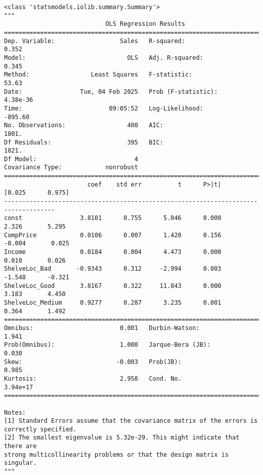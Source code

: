 \documentclass[
  letterpaper,
  DIV=11,
  numbers=noendperiod]{scrreprt}
\begin{document}
\begin{verbatim}
<class 'statsmodels.iolib.summary.Summary'>
"""
                            OLS Regression Results                            
==============================================================================
Dep. Variable:                  Sales   R-squared:                       0.352
Model:                            OLS   Adj. R-squared:                  0.345
Method:                 Least Squares   F-statistic:                     53.63
Date:                Tue, 04 Feb 2025   Prob (F-statistic):           4.38e-36
Time:                        09:05:52   Log-Likelihood:                -895.60
No. Observations:                 400   AIC:                             1801.
Df Residuals:                     395   BIC:                             1821.
Df Model:                           4                                         
Covariance Type:            nonrobust                                         
====================================================================================
                       coef    std err          t      P>|t|      [0.025      0.975]
------------------------------------------------------------------------------------
const                3.8101      0.755      5.046      0.000       2.326       5.295
CompPrice            0.0106      0.007      1.420      0.156      -0.004       0.025
Income               0.0184      0.004      4.473      0.000       0.010       0.026
ShelveLoc_Bad       -0.9343      0.312     -2.994      0.003      -1.548      -0.321
ShelveLoc_Good       3.8167      0.322     11.843      0.000       3.183       4.450
ShelveLoc_Medium     0.9277      0.287      3.235      0.001       0.364       1.492
==============================================================================
Omnibus:                        0.001   Durbin-Watson:                   1.941
Prob(Omnibus):                  1.000   Jarque-Bera (JB):                0.030
Skew:                          -0.003   Prob(JB):                        0.985
Kurtosis:                       2.958   Cond. No.                     3.94e+17
==============================================================================

Notes:
[1] Standard Errors assume that the covariance matrix of the errors is correctly specified.
[2] The smallest eigenvalue is 5.32e-29. This might indicate that there are
strong multicollinearity problems or that the design matrix is singular.
"""
\end{verbatim}
\end{document}
